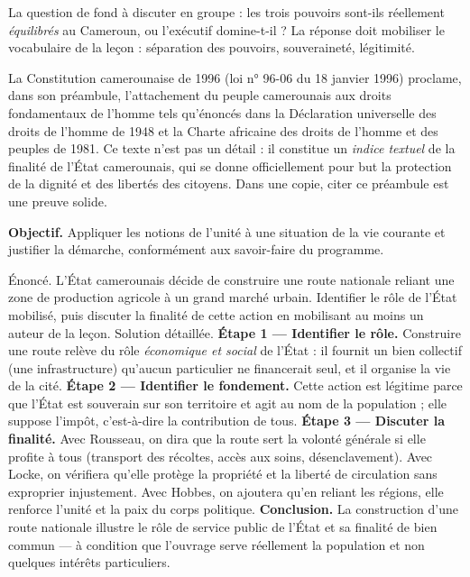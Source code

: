 \documentclass[11pt]{article}
\newcommand{\cle}[1]{{\popxbold\color{popdark}#1}}
\newcounter{popsec}
\newcounter{popsub}
\newcommand{\courssub}[1]{%
  \stepcounter{popsub}%
  \par\vspace{9pt}\noindent{\popxbold\fontsize{11.5}{13}\selectfont\color{popink}{\color{poporange}\thepopsec.\thepopsub}\hspace{6pt}#1}\par\nopagebreak\vspace{4pt}
}
\begin{document}
La question de fond à discuter en groupe : les trois pouvoirs sont-ils réellement \emph{équilibrés} au Cameroun, ou l'exécutif domine-t-il ? La réponse doit mobiliser le vocabulaire de la leçon : \cle{séparation des pouvoirs}, \cle{souveraineté}, \cle{légitimité}.

\begin{savaistu}
La Constitution camerounaise de 1996 (loi n° 96-06 du 18 janvier 1996) proclame, dans son préambule, l'attachement du peuple camerounais aux droits fondamentaux de l'homme tels qu'énoncés dans la Déclaration universelle des droits de l'homme de 1948 et la Charte africaine des droits de l'homme et des peuples de 1981. Ce texte n'est pas un détail : il constitue un \emph{indice textuel} de la finalité de l'État camerounais, qui se donne officiellement pour but la protection de la dignité et des libertés des citoyens. Dans une copie, citer ce préambule est une preuve solide.
\end{savaistu}

\courssub{Dossier guidé : étude d'un cas concret}

\textbf{Objectif.} Appliquer les notions de l'unité à une situation de la vie courante et justifier la démarche, conformément aux savoir-faire du programme.

\begin{exoresolu}
Énoncé. L'État camerounais décide de construire une route nationale reliant une zone de production agricole à un grand marché urbain. Identifier le rôle de l'État mobilisé, puis discuter la finalité de cette action en mobilisant au moins un auteur de la leçon.
\tcblower
Solution détaillée.
\textbf{Étape 1 — Identifier le rôle.} Construire une route relève du rôle \emph{économique et social} de l'État : il fournit un bien collectif (une infrastructure) qu'aucun particulier ne financerait seul, et il organise la vie de la cité.
\textbf{Étape 2 — Identifier le fondement.} Cette action est légitime parce que l'État est souverain sur son territoire et agit au nom de la population ; elle suppose l'impôt, c'est-à-dire la contribution de tous.
\textbf{Étape 3 — Discuter la finalité.} Avec Rousseau, on dira que la route sert la volonté générale si elle profite à tous (transport des récoltes, accès aux soins, désenclavement). Avec Locke, on vérifiera qu'elle protège la propriété et la liberté de circulation sans exproprier injustement. Avec Hobbes, on ajoutera qu'en reliant les régions, elle renforce l'unité et la paix du corps politique.
\textbf{Conclusion.} La construction d'une route nationale illustre le rôle de service public de l'État et sa finalité de bien commun — à condition que l'ouvrage serve réellement la population et non quelques intérêts particuliers.
\end{exoresolu}
\end{document}
